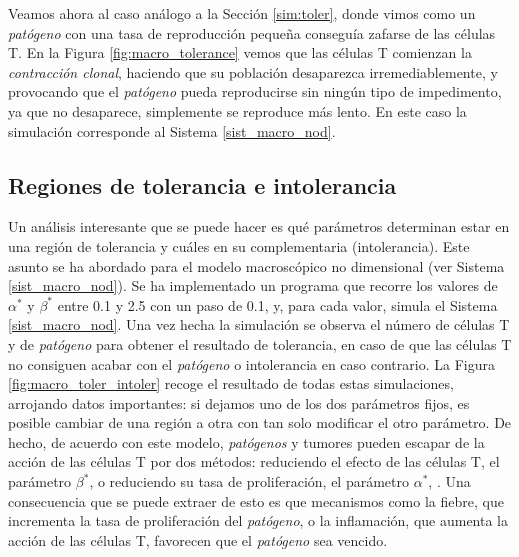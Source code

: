 Veamos ahora al caso análogo a la Sección \ref{sim:toler}, donde vimos como un \textit{patógeno} con una tasa de reproducción pequeña conseguía zafarse de las células T. En la Figura \ref{fig:macro_tolerance} vemos que las células T comienzan la \textit{contracción clonal}, haciendo que su población desaparezca irremediablemente, y provocando que el \textit{patógeno} pueda reproducirse sin ningún tipo de impedimento, ya que no desaparece, simplemente se reproduce más lento. En este caso la simulación corresponde al Sistema \ref{sist_macro_nod}.




\subsection{Regiones de tolerancia e intolerancia}

Un análisis interesante que se puede hacer es qué parámetros determinan estar en una región de tolerancia y cuáles en su complementaria (intolerancia). Este asunto se ha abordado para el modelo macroscópico no dimensional (ver Sistema \ref{sist_macro_nod}). Se ha implementado un programa que recorre los valores de $\alpha^{*}$ y $\beta^{*}$ entre 0.1 y 2.5 con un paso de 0.1, y, para cada valor, simula el Sistema \ref{sist_macro_nod}. Una vez hecha la simulación se observa el número de células T y de \textit{patógeno} para obtener el resultado de tolerancia, en caso de que las células T no consiguen acabar con el \textit{patógeno} o intolerancia en caso contrario. La Figura \ref{fig:macro_toler_intoler} recoge el resultado de todas estas simulaciones, arrojando datos importantes: si dejamos uno de los dos parámetros fijos, es posible cambiar de una región a otra con tan solo modificar el otro parámetro. De hecho, de acuerdo con este modelo, \textit{patógenos} y tumores pueden escapar de la acción de las células T por dos métodos: reduciendo el efecto de las células T, el parámetro $\beta^{*}$, o reduciendo su tasa de proliferación, el parámetro $\alpha^{*}$, \citep{arias2016emergent}. Una consecuencia que se puede extraer de esto es que mecanismos como la fiebre, que incrementa la tasa de proliferación del \textit{patógeno}, o la inflamación, que aumenta la acción de las células T, favorecen que el \textit{patógeno} sea vencido. 

